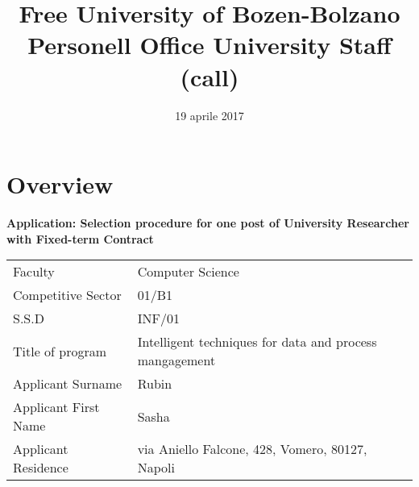 \documentclass{article}
\title{Free University of Bozen-Bolzano\\
Personell Office University Staff (call)\\
}
\date{19 aprile 2017}
\begin{document}
\maketitle
\tableofcontents

\newpage

{\center \section{Overview}}


\textbf{Application: Selection procedure for one post of University Researcher with Fixed-term Contract}

\vspace{1cm}

\begin{tabular}{ l  l }
Faculty \dotfill & Computer Science\\
Competitive Sector \dotfill &   01/B1\\
S.S.D \dotfill &  INF/01\\
Title of program \dotfill & Intelligent techniques for data and process mangagement\\
Applicant Surname \dotfill & Rubin \\
Applicant First Name \dotfill & Sasha\\
Applicant Residence \dotfill &  via Aniello Falcone, 428, Vomero, 80127, Napoli\\
\end{tabular}


% 
\end{document}
